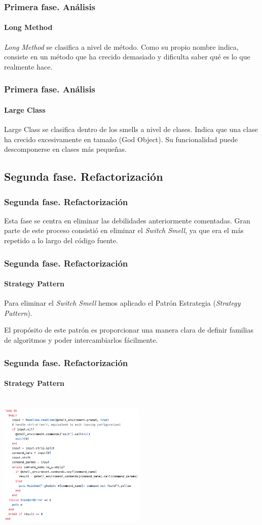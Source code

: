 \documentclass{beamer}
\begin{document}
\begin{frame}
  \frametitle{Primera fase. Análisis}
  \framesubtitle{Long Method}
  {\it Long Method} se clasifica a nivel de método. Como su propio nombre indica,
  consiste en un método que ha crecido demasiado y dificulta saber qué es lo que realmente hace.
\end{frame}

\begin{frame}
  \frametitle{Primera fase. Análisis}
  \framesubtitle{Large Class}
    Large Class se clasifica dentro de los smells a nivel de clases. Indica que una clase ha crecido excesivamente en tamaño
    (God Object). Su funcionalidad puede descomponerse en clases más pequeñas.
\end{frame}


\subsection{Segunda fase. Refactorización}
\begin{frame}
\frametitle{Segunda fase. Refactorización}
  Esta fase se centra en eliminar las debilidades anteriormente comentadas. Gran parte de este proceso
  consistió en eliminar el {\it Switch Smell}, ya que era el más repetido a lo largo del código fuente.

\end{frame}

\begin{frame}
  \frametitle{Segunda fase. Refactorización}
  \framesubtitle{Strategy Pattern}
  Para eliminar el {\it Switch Smell} hemos aplicado el Patrón Estrategia ({\it Strategy Pattern}).
  \bigskip

  El propósito de este patrón es proporcionar una manera clara de definir familias de algoritmos y poder intercambiarlos fácilmente.
  
\end{frame}

\begin{frame}
  \frametitle{Segunda fase. Refactorización}
  \framesubtitle{Strategy Pattern}

  \centering
  \includegraphics[height=7cm, width=7cm]{img/new-loop.png}
\end{frame}
\end{document}
